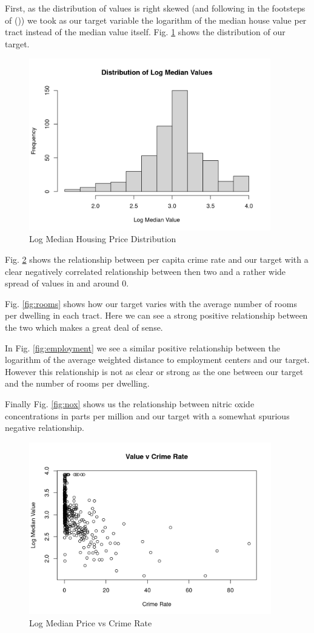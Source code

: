 \documentclass[11pt]{article}
\begin{document}
First, as the distribution of values is right skewed (and following in the footsteps of (\cite{book})) we took as our target variable the logarithm of the median house value per tract instead of the median value itself. Fig. \ref{fig:price_dist} shows the distribution of our target. 

\begin{figure}[h!] 
  \centering
  \includegraphics[height=75mm]{price_dist.png}
  \caption{Log Median Housing Price Distribution}
  \label{fig:price_dist}
\end{figure}

Fig. \ref{fig:crime} shows the relationship between per capita crime rate and our target with a clear negatively correlated relationship between then two and a rather wide spread of values in and around 0. 

Fig. \ref{fig:rooms} shows how our target varies with the average number of rooms per dwelling in each tract. Here we can see a strong positive relationship between the two which makes a great deal of sense. 

In Fig. \ref{fig:employment} we see a similar positive relationship between the logarithm of the average weighted distance to employment centers and our target. However this relationship is not as clear or strong as the one between our target and the number of rooms per dwelling. 

Finally Fig. \ref{fig:nox} shows us the relationship between nitric oxide concentrations in parts per million and our target with a somewhat spurious negative relationship. 

\begin{figure}[h!] 
  \centering
  \includegraphics[height=75mm]{crime.png}
  \caption{Log Median Price vs Crime Rate}
  \label{fig:crime}
\end{figure}
\end{document}
